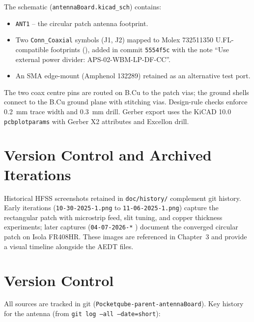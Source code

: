 The schematic (\texttt{antennaBoard.kicad\_sch}) contains:

\begin{itemize}[noitemsep]
    \item \texttt{ANT1} -- the circular patch antenna footprint.
    \item Two \texttt{Conn\_Coaxial} symbols (J1, J2) mapped to Molex 732511350 U.FL-compatible footprints (), added in commit \texttt{5554f5c} with the note ``Use external power divider: APS-02-WBM-LP-DF-CC''.
    \item An SMA edge-mount (Amphenol 132289) retained as an alternative test port.
\end{itemize}

The two coax centre pins are routed on B.Cu to the patch vias; the ground shells connect to the B.Cu ground plane with stitching vias. Design-rule checks enforce 0.2~mm trace width and 0.3~mm drill. Gerber export uses the KiCAD 10.0 \texttt{pcbplotparams} with Gerber X2 attributes and Excellon drill.

\section{Version Control and Archived Iterations}

Historical HFSS screenshots retained in \texttt{doc/history/} complement git history. Early iterations (\texttt{10-30-2025-1.png} to \texttt{11-06-2025-1.png}) capture the rectangular patch with microstrip feed, slit tuning, and copper thickness experiments; later captures (\texttt{04-07-2026-*} ) document the converged circular patch on Isola FR408HR. These images are referenced in Chapter~3 and provide a visual timeline alongside the AEDT files.

\section{Version Control}

All sources are tracked in git (\texttt{Pocketqube-parent-antennaBoard}). Key history for the antenna (from \texttt{git log --all --date=short}):

